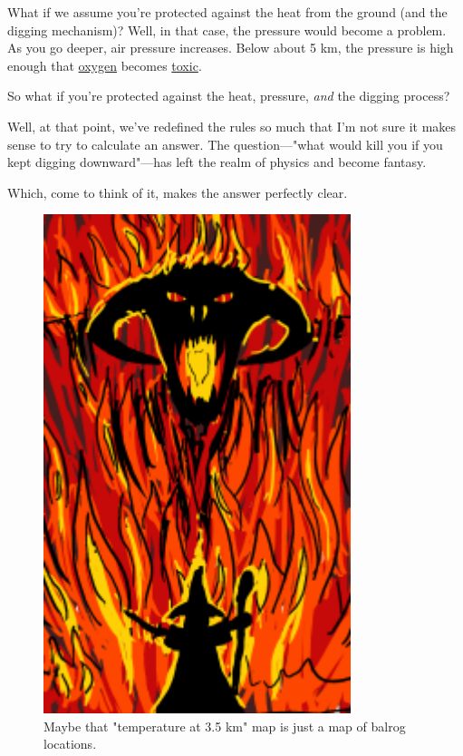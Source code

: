 {{What if we assume you're protected against the heat from the ground (and the digging mechanism)? Well, in that case, the pressure would become a problem. As you go deeper, air pressure increases. Below about 5 km, the pressure is high enough that \href{http://www.scuba-doc.com/oxygentox.html}{oxygen} becomes \href{https://www.youtube.com/watch?v=LOZuxwVk7TU} {toxic}.}

{So what if you're protected against the heat, pressure, \emph{and} the digging process?}

{Well, at that point, we've redefined the rules so much that I'm not sure it makes sense to try to calculate an answer. The question—"what would kill you if you kept digging downward"—has left the realm of physics and become fantasy.}

{Which, come to think of it, makes the answer perfectly clear.}

\begin{figure}[!htbp]
\centering
\includegraphics[scale=0.5, max width=0.8\textwidth]{imgs/a/135/balrog.png}
\caption{Maybe that "temperature at 3.5 km" map is just a map of balrog locations.}
\end{figure}

}
